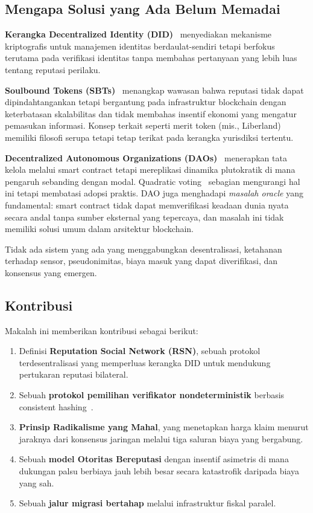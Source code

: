 \documentclass[11pt,a4paper,twocolumn]{article}
\begin{document}
\subsection{Mengapa Solusi yang Ada Belum Memadai}

\textbf{Kerangka Decentralized Identity (DID)}~\cite{did2022} menyediakan mekanisme kriptografis untuk manajemen identitas berdaulat-sendiri tetapi berfokus terutama pada verifikasi identitas tanpa membahas pertanyaan yang lebih luas tentang reputasi perilaku.

\textbf{Soulbound Tokens (SBTs)}~\cite{weyl2022} menangkap wawasan bahwa reputasi tidak dapat dipindahtangankan tetapi bergantung pada infrastruktur blockchain dengan keterbatasan skalabilitas dan tidak membahas insentif ekonomi yang mengatur pemasukan informasi. Konsep terkait seperti merit token (mis., Liberland) memiliki filosofi serupa tetapi tetap terikat pada kerangka yurisdiksi tertentu.

\textbf{Decentralized Autonomous Organizations (DAOs)}~\cite{buterin2014} menerapkan tata kelola melalui smart contract tetapi mereplikasi dinamika plutokratik di mana pengaruh sebanding dengan modal. Quadratic voting~\cite{buterin2019} sebagian mengurangi hal ini tetapi membatasi adopsi praktis. DAO juga menghadapi \emph{masalah oracle} yang fundamental: smart contract tidak dapat memverifikasi keadaan dunia nyata secara andal tanpa sumber eksternal yang tepercaya, dan masalah ini tidak memiliki solusi umum dalam arsitektur blockchain.

Tidak ada sistem yang ada yang menggabungkan desentralisasi, ketahanan terhadap sensor, pseudonimitas, biaya masuk yang dapat diverifikasi, dan konsensus yang emergen.

\subsection{Kontribusi}

Makalah ini memberikan kontribusi sebagai berikut:
\begin{enumerate}[nosep]
\item Definisi \textbf{Reputation Social Network (RSN)}, sebuah protokol terdesentralisasi yang memperluas kerangka DID untuk mendukung pertukaran reputasi bilateral.
\item Sebuah \textbf{protokol pemilihan verifikator nondeterministik} berbasis consistent hashing~\cite{karger1997}.
\item \textbf{Prinsip Radikalisme yang Mahal}, yang menetapkan harga klaim menurut jaraknya dari konsensus jaringan melalui tiga saluran biaya yang bergabung.
\item Sebuah \textbf{model Otoritas Bereputasi} dengan insentif asimetris di mana dukungan palsu berbiaya jauh lebih besar secara katastrofik daripada biaya yang sah.
\item Sebuah \textbf{jalur migrasi bertahap} melalui infrastruktur fiskal paralel.
\end{enumerate}
\end{document}
